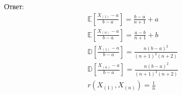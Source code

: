 \documentclass[14pt]{extarticle}
\begin{document}
Ответ:
\begin{gather*}
\mathbb{E}\left[\frac{X_{(1)} - a}{b-a}\right] = \frac{b-a}{n+1} + a \\
\mathbb{E}\left[\frac{X_{(n)} - a}{b-a}\right] = \frac{a-b}{n+1} + b \\
\mathbb{D}\left[\frac{X_{(1)} - a}{b-a}\right] = \frac{n(b-a)^2}{(n+1)^2(n+2)} \\
\mathbb{D}\left[\frac{X_{(n)} - a}{b-a}\right] = \frac{n(b-a)^2}{(n+1)^2(n+2)} \\
r\left(X_{(1)}, X_{(n)}\right)=\frac{1}{n}
\end{gather*}
\end{document}
